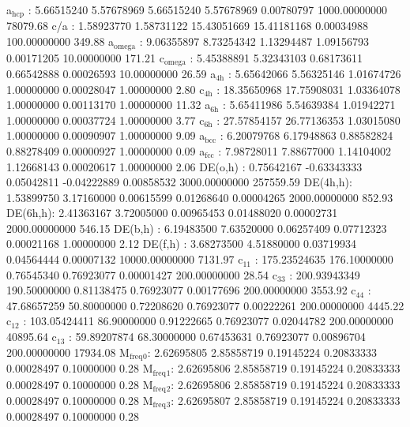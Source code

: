 \documentclass[11pt]{article}
\begin{document}
a\(_{\text{hcp}}\)   :   5.66515240   5.57678969   5.66515240   5.57678969   0.00780797 1000.00000000     78079.68
c/a     :   1.58923770   1.58731122  15.43051669  15.41181168   0.00034988 100.00000000       349.88
a\(_{\text{omega}}\) :   9.06355897   8.73254342   1.13294487   1.09156793   0.00171205  10.00000000       171.21
c\(_{\text{omega}}\) :   5.45388891   5.32343103   0.68173611   0.66542888   0.00026593  10.00000000        26.59
a\(_{\text{4h}}\)    :   5.65642066   5.56325146   1.01674726   1.00000000   0.00028047   1.00000000         2.80
c\(_{\text{4h}}\)    :  18.35650968  17.75908031   1.03364078   1.00000000   0.00113170   1.00000000        11.32
a\(_{\text{6h}}\)    :   5.65411986   5.54639384   1.01942271   1.00000000   0.00037724   1.00000000         3.77
c\(_{\text{6h}}\)    :  27.57854157  26.77136353   1.03015080   1.00000000   0.00090907   1.00000000         9.09
a\(_{\text{bcc}}\)   :   6.20079768   6.17948863   0.88582824   0.88278409   0.00000927   1.00000000         0.09
a\(_{\text{fcc}}\)   :   7.98728011   7.88677000   1.14104002   1.12668143   0.00020617   1.00000000         2.06
DE(o,h) :   0.75642167  -0.63343333   0.05042811  -0.04222889   0.00858532 3000.00000000    257559.59
DE(4h,h):   1.53899750   3.17160000   0.00615599   0.01268640   0.00004265 2000.00000000       852.93
DE(6h,h):   2.41363167   3.72005000   0.00965453   0.01488020   0.00002731 2000.00000000       546.15
DE(b,h) :   6.19483500   7.63520000   0.06257409   0.07712323   0.00021168   1.00000000         2.12
DE(f,h) :   3.68273500   4.51880000   0.03719934   0.04564444   0.00007132 10000.00000000      7131.97
c\(_{\text{11}}\)    : 175.23524635 176.10000000   0.76545340   0.76923077   0.00001427 200.00000000        28.54
c\(_{\text{33}}\)    : 200.93943349 190.50000000   0.81138475   0.76923077   0.00177696 200.00000000      3553.92
c\(_{\text{44}}\)    :  47.68657259  50.80000000   0.72208620   0.76923077   0.00222261 200.00000000      4445.22
c\(_{\text{12}}\)    : 103.05424411  86.90000000   0.91222665   0.76923077   0.02044782 200.00000000     40895.64
c\(_{\text{13}}\)    :  59.89207874  68.30000000   0.67453631   0.76923077   0.00896704 200.00000000     17934.08
M\(_{\text{freq}}\)\(_{\text{0}}\):   2.62695805   2.85858719   0.19145224   0.20833333   0.00028497   0.10000000         0.28
M\(_{\text{freq}}\)\(_{\text{1}}\):   2.62695806   2.85858719   0.19145224   0.20833333   0.00028497   0.10000000         0.28
M\(_{\text{freq}}\)\(_{\text{2}}\):   2.62695806   2.85858719   0.19145224   0.20833333   0.00028497   0.10000000         0.28
M\(_{\text{freq}}\)\(_{\text{3}}\):   2.62695807   2.85858719   0.19145224   0.20833333   0.00028497   0.10000000         0.28
\end{document}

